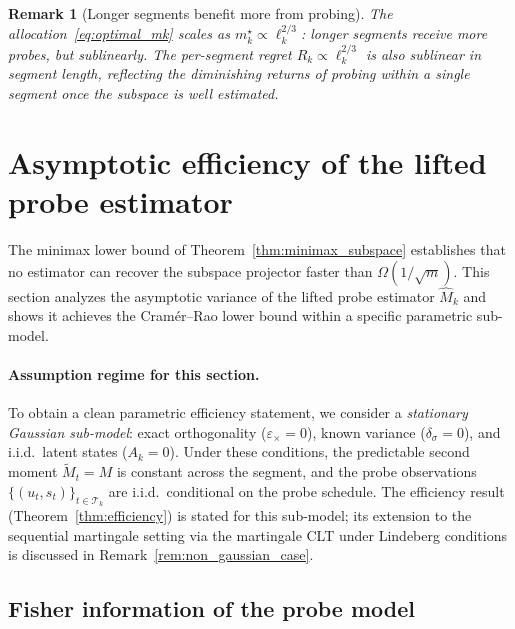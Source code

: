 \documentclass[12pt]{article}
\newcommand{\cT}{\mathcal{T}}
\newtheorem{remark}{Remark}
\theoremstyle{plain}
\theoremstyle{definition}
\begin{document}
\begin{remark}[Longer segments benefit more from probing]
The allocation~\eqref{eq:optimal_mk} scales as $m_k^\star \propto \ell_k^{2/3}$: longer segments receive more probes, but sublinearly. The per-segment regret $R_k \propto \ell_k^{2/3}$ is also sublinear in segment length, reflecting the diminishing returns of probing within a single segment once the subspace is well estimated.
\end{remark}


\section{Asymptotic efficiency of the lifted probe estimator}
\label{sec:efficiency}

The minimax lower bound of Theorem~\ref{thm:minimax_subspace} establishes that no estimator can recover the subspace projector faster than $\Omega(1/\sqrt{m})$. This section analyzes the asymptotic variance of the lifted probe estimator $\widehat{M}_k$ and shows it achieves the Cram\'er--Rao lower bound within a specific parametric sub-model.

\paragraph{Assumption regime for this section.}
To obtain a clean parametric efficiency statement, we consider a \emph{stationary Gaussian sub-model}: exact orthogonality ($\varepsilon_\times = 0$), known variance ($\delta_\sigma = 0$), and i.i.d.\ latent states ($A_k = 0$). Under these conditions, the predictable second moment $\widetilde{M}_t = M$ is constant across the segment, and the probe observations $\{(u_t, s_t)\}_{t \in \cT_k}$ are i.i.d.\ conditional on the probe schedule. The efficiency result (Theorem~\ref{thm:efficiency}) is stated for this sub-model; its extension to the sequential martingale setting via the martingale CLT under Lindeberg conditions is discussed in Remark~\ref{rem:non_gaussian_case}.

\subsection{Fisher information of the probe model}
\end{document}
